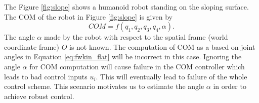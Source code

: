 The Figure \ref{fig:slope} shows a humanoid robot standing on the sloping surface. %
 The COM of the robot in Figure \ref{fig:slope} is given by $$COM = f(q_1,q_2,q_3,q_4,\alpha).$$  The angle $\alpha$ made by the robot with respect to the spatial frame (world coordinate frame) $O$ is not known. The computation of COM as a based on joint angles in Equation \ref{eq:fwkin_flat} will be incorrect in this case. Ignoring the angle $\alpha$ for COM computation will cause failure in the COM controller which leads to bad control inputs $u_i$. This will eventually lead to failure of the whole control scheme. This scenario motivates us to estimate the angle $\alpha$ in order to achieve robust control.  

